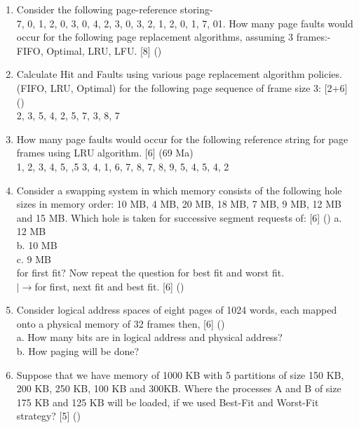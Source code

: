 \documentclass[12pt]{article}
\newcommand{\lb}{\\$\left|\rightarrow\right.$}
\begin{document}
\begin{enumerate}
			\item Consider the following page-reference storing-\\
			7, 0, 1, 2, 0, 3, 0, 4, 2, 3, 0, 3, 2, 1, 2, 0, 1, 7, 01. How many page faults would occur for the following page replacement algorithms, assuming 3 frames:-\\
			FIFO, Optimal, LRU, LFU. \hfill [8] ()

			\item Calculate Hit and Faults using various page replacement algorithm policies. (FIFO, LRU, Optimal) for the following page sequence of frame size 3: \hfill [2+6] ()\\
			2, 3, 5, 4, 2, 5, 7, 3, 8, 7

			\item How many page faults would occur for the following reference string for page frames using LRU algorithm. \hfill [6] (69 Ma)\\
			1, 2, 3, 4, 5, ,5 3, 4, 1, 6, 7, 8, 7, 8, 9, 5, 4, 5, 4, 2

			\item Consider a swapping system in which memory consists of the following hole sizes in memory order: 10 MB, 4 MB, 20 MB, 18 MB, 7 MB, 9 MB, 12 MB and 15 MB. Which hole is taken for successive segment requests of: \hfill [6] ()
			a. 12 MB\\
			b. 10 MB\\
			c. 9 MB\\
			for first fit? Now repeat the question for best fit and worst fit.
			\lb for first, next fit and best fit. \hfill [6] ()

			\item Consider logical address spaces of eight pages of 1024 words, each mapped onto a physical memory of 32 frames then, \hfill [6] ()\\
			a. How many bits are in logical address and physical address?\\
			b. How paging will be done?

			\item Suppose that we have memory of 1000 KB with 5 partitions of size 150 KB, 200 KB, 250 KB, 100 KB and 300KB. Where the processes A and B of size 175 KB and 125 KB will be loaded, if we used Best-Fit and Worst-Fit strategy? \hfill [5] ()


\end{enumerate}
\end{document}
